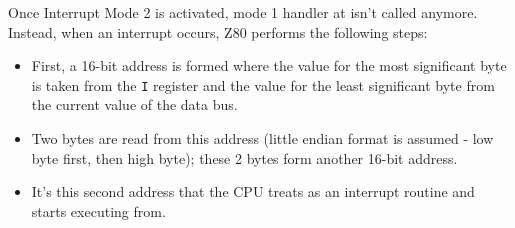 Once Interrupt Mode 2 is activated, mode 1 handler at  isn't called anymore. Instead, when an interrupt occurs, Z80 performs the following steps:

\begin{itemize}[topsep=1pt,itemsep=1pt]
	\item First, a 16-bit address is formed where the value for the most significant byte is taken from the {\tt I} register and the value for the least significant byte from the current value of the data bus.
	
	\item Two bytes are read from this address (little endian format is assumed - low byte first, then high byte); these 2 bytes form another 16-bit address.
	
	\item It's this second address that the CPU treats as an interrupt routine and starts executing from.
\end{itemize}

